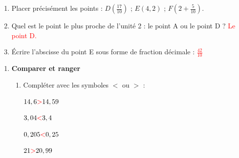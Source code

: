 \documentclass[a4paper]{book}
\begin{document}
{\begin{exercice}
\begin{enumerate}[leftmargin=*]
            L'abscisse du point $A$ est : \textcolor{red}{0,9} \quad \quad
            L'abscisse du point $B$ est : \textcolor{red}{2,9}  \quad \quad
            L'abscisse du point $C$ est : \textcolor{red}{1,7} 

            \medskip
    
            \item Placer précisément les points : $D(\frac{17}{10})$ ; $E(4,2)$ ; $F(2 + \frac{5}{10})$.

            \medskip
    
            \item Quel est le point le plus proche de l'unité 2 : le point A ou le point D ? \textcolor{red}{Le point D.}

            \medskip
            
            \item Écrire l'abscisse du point E sous forme de fraction décimale : \textcolor{red}{$\frac{42}{10}$}
        \end{enumerate}   
    \end{exercice}
    

    \begin{exercice}
        \begin{enumerate}[leftmargin=*]
            \item \textbf{Comparer et ranger}

            \begin{enumerate}[leftmargin=*]
                \item Compléter avec les symboles $<$ ou $>$ :
                
                    \begin{minipage}{0.45\linewidth}
                        $14,6 \textcolor{red}{>} 14,59$

                        \medskip
                        
                        $3,04 \textcolor{red}{<} 3,4$
                    \end{minipage}
                    \hfill \vline \hfill
                    \begin{minipage}{0.45\linewidth}
                        $0,205 \textcolor{red}{<} 0,25$

                        \medskip
                        
                        $21 \textcolor{red}{>} 20,99$
                    \end{minipage}


\end{enumerate}
\end{enumerate}
\end{exercice}}
\end{document}
